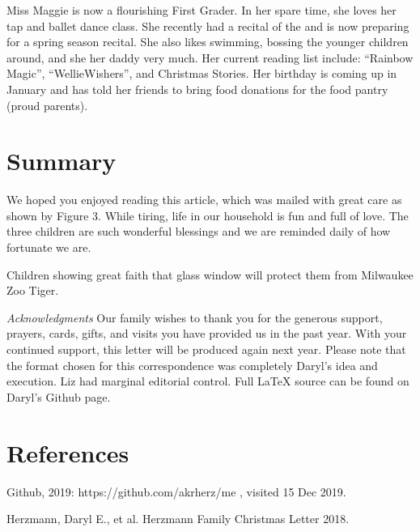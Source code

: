 \documentclass[letterpaper,11pt]{article}
\makeatletter
\def\refer{\par\noindent\hangindent\parindent\hangafter1}
\newenvironment{figurehere}
  {\def\@captype{figure}}
  {}
\makeatother
\begin{document}
\begin{multicols}{2}
Miss Maggie is now a flourishing First Grader. In her spare time, she loves her
tap and ballet dance class.  She recently had a recital of the 
and is now preparing for a spring season recital.  She also likes swimming,
bossing the younger children around, and she  her daddy very
much.  Her current reading list include:
\enquote{Rainbow Magic}, \enquote{WellieWishers\texttrademark}, and
Christmas Stories.  Her birthday is coming up in January and has told her
friends to bring food donations for the food pantry (proud parents).

\section{Summary}

We hoped you enjoyed reading this article, which was mailed with great care
as shown by Figure 3.  While tiring, life in our household is fun and full of
love.  The three children are such wonderful blessings and we are reminded daily of
how fortunate we are. 

\bigskip

\begin{figurehere}
 \centering   
 \caption{Children showing great faith that glass window will protect them from Milwaukee Zoo Tiger.}
\end{figurehere}

\bigskip

\emph{Acknowledgments} Our family wishes to thank you for the generous 
support, prayers, cards, gifts, and visits you have provided us in the past
year. With your continued support, this letter will be produced again
next year. Please note that the format chosen for this
correspondence was completely Daryl's idea and execution. Liz had marginal
editorial control. Full \LaTeX\xspace source can be found on Daryl's Github
page.

\section{References}

\refer Github, 2019: https://github.com/akrherz/me , visited 15 Dec 2019.
\refer Herzmann, Daryl E., et al. Herzmann Family Christmas Letter 2018.

\end{multicols}
\end{document}
